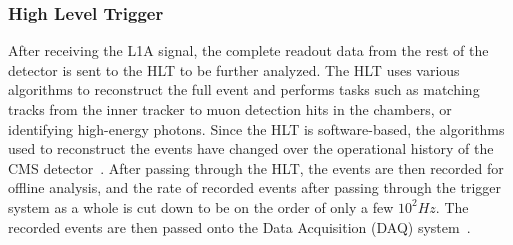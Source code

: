 \subsubsection{High Level Trigger}

After receiving the L1A signal, the complete readout data from the rest of the detector is sent to the HLT to be further analyzed.
The HLT uses various algorithms to reconstruct the full event and performs tasks such as matching tracks from the inner tracker to muon detection hits in the chambers, or identifying high-energy photons.
Since the HLT is software-based, the algorithms used to reconstruct the events have changed over the operational history of the CMS detector~\cite{Trocino_2014}.
After passing through the HLT, the events are then recorded for offline analysis, and the rate of recorded events after passing through the trigger system as a whole is cut down to be on the order of only a few $10^2\unit{Hz}$.
The recorded events are then passed onto the Data Acquisition (DAQ) system~\cite{Cittolin:578006}.

